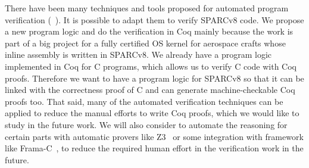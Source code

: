 There have been many techniques and tools proposed for automated
program verification (\eg~\cite{SymbolicExecutionSpLogic,Smallfoot}).
It is possible to adapt them to verify SPARCv8 code.
We propose a new program logic and do the verification in Coq mainly
because the work is part of a big project for a fully certified OS 
kernel for aerospace crafts whose inline assembly is written in 
SPARCv8. We already have a program logic implemented in Coq for 
C programs, which allows us to verify C code with Coq proofs. 
Therefore we want to have a program logic for SPARCv8 so that 
it can be linked with the correctness proof of 
C and can generate machine-checkable Coq proofs too.
That said, many of the automated verification techniques can
be applied to reduce the manual efforts to write Coq proofs,
which we would like to study in the future work. 
{\color{blue}
We will also consider to automate the reasoning  
for certain parts with automatic provers like Z3~\cite{Z3} 
or some integration with framework like Frama-C~\cite{framac}, to 
reduce the required human effort in the verification work 
in the future. 
}


